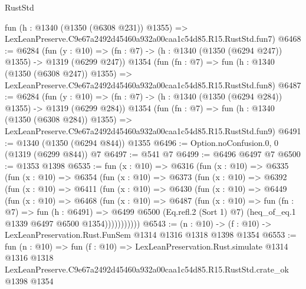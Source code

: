 \begin{lexlean}{RustStd}
\begin{coremodule}
    fun (h : @1340 (@1350 (@6308 @231)) @1355) =>
    LexLeanPreserve.C9e67a2492d45460a932a00caa1c54d85.R15.RustStd.fun7)
@6468 := @6284
    (fun (y : @10) => (fn : @7) -> (h : @1340 (@1350 (@6294 @247)) @1355) -> @1319 (@6299 @247))
    @1354
    (fun (fn : @7) =>
    fun (h : @1340 (@1350 (@6308 @247)) @1355) =>
    LexLeanPreserve.C9e67a2492d45460a932a00caa1c54d85.R15.RustStd.fun8)
@6487 := @6284
    (fun (y : @10) => (fn : @7) -> (h : @1340 (@1350 (@6294 @284)) @1355) -> @1319 (@6299 @284))
    @1354
    (fun (fn : @7) =>
    fun (h : @1340 (@1350 (@6308 @284)) @1355) =>
    LexLeanPreserve.C9e67a2492d45460a932a00caa1c54d85.R15.RustStd.fun9)
@6491 := @1340 (@1350 (@6294 @844)) @1355
@6496 := Option.noConfusion.{0, 0} (@1319 (@6299 @844)) @7
@6497 := @541 @7
@6499 := @6496 @6497 @7
@6500 := @1353 @1398
@6535 := fun (x : @10) =>
  @6316
    (fun (x : @10) =>
    @6335
      (fun (x : @10) =>
      @6354
        (fun (x : @10) =>
        @6373
          (fun (x : @10) =>
          @6392
            (fun (x : @10) =>
            @6411
              (fun (x : @10) =>
              @6430
                (fun (x : @10) =>
                @6449
                  (fun (x : @10) =>
                  @6468
                    (fun (x : @10) =>
                    @6487
                      (fun (x : @10) =>
                      fun (fn : @7) =>
                      fun (h : @6491) =>
                      @6499
                        @6500
                        (Eq.refl.{2} (Sort 1) @7)
                        (heq_of_eq.{1} @1339 @6497 @6500 @1354)))))))))))
@6543 := (n : @10) -> (f : @10) -> LexLeanPreservation.Rust.FunSem @1314 @1316 @1318 @1398 @1354
@6553 := fun (n : @10) =>
  fun (f : @10) =>
  LexLeanPreservation.Rust.simulate
    @1314
    @1316
    @1318
    LexLeanPreserve.C9e67a2492d45460a932a00caa1c54d85.R15.RustStd.crate_ok
    @1398
    @1354
\end{coremodule}
\end{lexlean}

